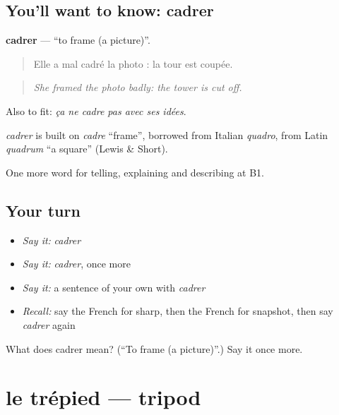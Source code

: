\subsection*{You'll want to know: cadrer}
\textbf{cadrer} — \textquotedblleft{}to frame (a picture)\textquotedblright{}.

\begin{quote}
Elle a mal cadré la photo : la tour est coupée.
\end{quote}

\begin{quote}
\emph{She framed the photo badly: the tower is cut off.}
\end{quote}

Also to fit: \emph{ça ne cadre pas avec ses idées}.

\begin{cousinweb}
\emph{cadrer} is built on \emph{cadre} \textquotedblleft{}frame\textquotedblright{}, borrowed from Italian \emph{quadro}, from Latin \emph{quadrum} \textquotedblleft{}a square\textquotedblright{} (Lewis \& Short).
\end{cousinweb}

\begin{grammarlens}[title={What you've built}]
One more word for telling, explaining and describing at B1.
\end{grammarlens}

\subsection*{Your turn}
\begin{itemize}
\raggedright
  \item \emph{Say it:} \emph{cadrer}
  \item \emph{Say it:} \emph{cadrer}, once more
  \item \emph{Say it:} a sentence of your own with \emph{cadrer}
  \item \emph{Recall:} say the French for sharp, then the French for snapshot, then say \emph{cadrer} again
\end{itemize}

\begin{tcolorbox}[breakable,colback=teal!4,colframe=teal!35!black,title={Before you move on}]
What does cadrer mean? (\textquotedblleft{}To frame (a picture)\textquotedblright{}.) Say it once more.
\end{tcolorbox}
\section[le trépied]{le trépied — tripod}

